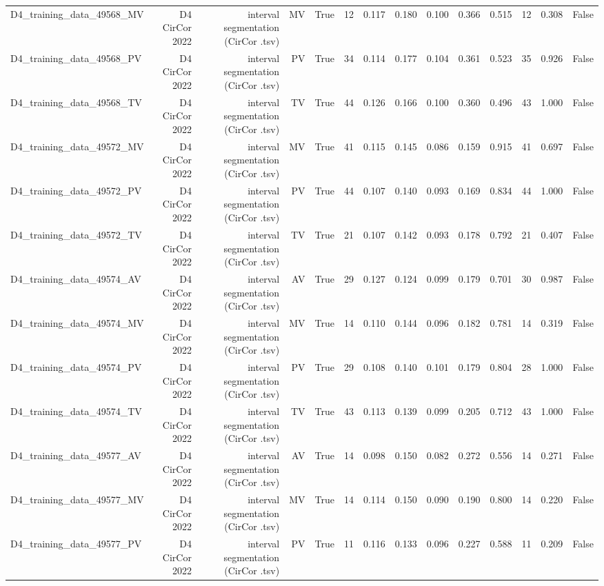 \begin{table}[htbp]
\begin{tabular}{lrrrrrrrrrrrrr}
    D4\_training\_data\_49568\_MV & D4 CirCor 2022 & interval segmentation (CirCor .tsv) & MV & True & 12 & 0.117 & 0.180 & 0.100 & 0.366 & 0.515 & 12 & 0.308 & False \\
    D4\_training\_data\_49568\_PV & D4 CirCor 2022 & interval segmentation (CirCor .tsv) & PV & True & 34 & 0.114 & 0.177 & 0.104 & 0.361 & 0.523 & 35 & 0.926 & False \\
    D4\_training\_data\_49568\_TV & D4 CirCor 2022 & interval segmentation (CirCor .tsv) & TV & True & 44 & 0.126 & 0.166 & 0.100 & 0.360 & 0.496 & 43 & 1.000 & False \\
    D4\_training\_data\_49572\_MV & D4 CirCor 2022 & interval segmentation (CirCor .tsv) & MV & True & 41 & 0.115 & 0.145 & 0.086 & 0.159 & 0.915 & 41 & 0.697 & False \\
    D4\_training\_data\_49572\_PV & D4 CirCor 2022 & interval segmentation (CirCor .tsv) & PV & True & 44 & 0.107 & 0.140 & 0.093 & 0.169 & 0.834 & 44 & 1.000 & False \\
    D4\_training\_data\_49572\_TV & D4 CirCor 2022 & interval segmentation (CirCor .tsv) & TV & True & 21 & 0.107 & 0.142 & 0.093 & 0.178 & 0.792 & 21 & 0.407 & False \\
    D4\_training\_data\_49574\_AV & D4 CirCor 2022 & interval segmentation (CirCor .tsv) & AV & True & 29 & 0.127 & 0.124 & 0.099 & 0.179 & 0.701 & 30 & 0.987 & False \\
    D4\_training\_data\_49574\_MV & D4 CirCor 2022 & interval segmentation (CirCor .tsv) & MV & True & 14 & 0.110 & 0.144 & 0.096 & 0.182 & 0.781 & 14 & 0.319 & False \\
    D4\_training\_data\_49574\_PV & D4 CirCor 2022 & interval segmentation (CirCor .tsv) & PV & True & 29 & 0.108 & 0.140 & 0.101 & 0.179 & 0.804 & 28 & 1.000 & False \\
    D4\_training\_data\_49574\_TV & D4 CirCor 2022 & interval segmentation (CirCor .tsv) & TV & True & 43 & 0.113 & 0.139 & 0.099 & 0.205 & 0.712 & 43 & 1.000 & False \\
    D4\_training\_data\_49577\_AV & D4 CirCor 2022 & interval segmentation (CirCor .tsv) & AV & True & 14 & 0.098 & 0.150 & 0.082 & 0.272 & 0.556 & 14 & 0.271 & False \\
    D4\_training\_data\_49577\_MV & D4 CirCor 2022 & interval segmentation (CirCor .tsv) & MV & True & 14 & 0.114 & 0.150 & 0.090 & 0.190 & 0.800 & 14 & 0.220 & False \\
    D4\_training\_data\_49577\_PV & D4 CirCor 2022 & interval segmentation (CirCor .tsv) & PV & True & 11 & 0.116 & 0.133 & 0.096 & 0.227 & 0.588 & 11 & 0.209 & False \\

\end{tabular}
\end{table}
